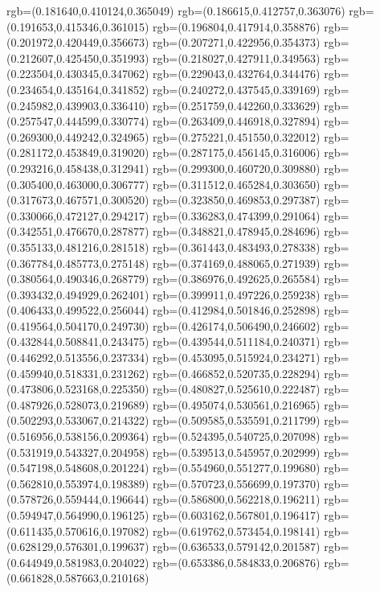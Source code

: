 {{{			rgb=(0.181640,0.410124,0.365049)
			rgb=(0.186615,0.412757,0.363076)
			rgb=(0.191653,0.415346,0.361015)
			rgb=(0.196804,0.417914,0.358876)
			rgb=(0.201972,0.420449,0.356673)
			rgb=(0.207271,0.422956,0.354373)
			rgb=(0.212607,0.425450,0.351993)
			rgb=(0.218027,0.427911,0.349563)
			rgb=(0.223504,0.430345,0.347062)
			rgb=(0.229043,0.432764,0.344476)
			rgb=(0.234654,0.435164,0.341852)
			rgb=(0.240272,0.437545,0.339169)
			rgb=(0.245982,0.439903,0.336410)
			rgb=(0.251759,0.442260,0.333629)
			rgb=(0.257547,0.444599,0.330774)
			rgb=(0.263409,0.446918,0.327894)
			rgb=(0.269300,0.449242,0.324965)
			rgb=(0.275221,0.451550,0.322012)
			rgb=(0.281172,0.453849,0.319020)
			rgb=(0.287175,0.456145,0.316006)
			rgb=(0.293216,0.458438,0.312941)
			rgb=(0.299300,0.460720,0.309880)
			rgb=(0.305400,0.463000,0.306777)
			rgb=(0.311512,0.465284,0.303650)
			rgb=(0.317673,0.467571,0.300520)
			rgb=(0.323850,0.469853,0.297387)
			rgb=(0.330066,0.472127,0.294217)
			rgb=(0.336283,0.474399,0.291064)
			rgb=(0.342551,0.476670,0.287877)
			rgb=(0.348821,0.478945,0.284696)
			rgb=(0.355133,0.481216,0.281518)
			rgb=(0.361443,0.483493,0.278338)
			rgb=(0.367784,0.485773,0.275148)
			rgb=(0.374169,0.488065,0.271939)
			rgb=(0.380564,0.490346,0.268779)
			rgb=(0.386976,0.492625,0.265584)
			rgb=(0.393432,0.494929,0.262401)
			rgb=(0.399911,0.497226,0.259238)
			rgb=(0.406433,0.499522,0.256044)
			rgb=(0.412984,0.501846,0.252898)
			rgb=(0.419564,0.504170,0.249730)
			rgb=(0.426174,0.506490,0.246602)
			rgb=(0.432844,0.508841,0.243475)
			rgb=(0.439544,0.511184,0.240371)
			rgb=(0.446292,0.513556,0.237334)
			rgb=(0.453095,0.515924,0.234271)
			rgb=(0.459940,0.518331,0.231262)
			rgb=(0.466852,0.520735,0.228294)
			rgb=(0.473806,0.523168,0.225350)
			rgb=(0.480827,0.525610,0.222487)
			rgb=(0.487926,0.528073,0.219689)
			rgb=(0.495074,0.530561,0.216965)
			rgb=(0.502293,0.533067,0.214322)
			rgb=(0.509585,0.535591,0.211799)
			rgb=(0.516956,0.538156,0.209364)
			rgb=(0.524395,0.540725,0.207098)
			rgb=(0.531919,0.543327,0.204958)
			rgb=(0.539513,0.545957,0.202999)
			rgb=(0.547198,0.548608,0.201224)
			rgb=(0.554960,0.551277,0.199680)
			rgb=(0.562810,0.553974,0.198389)
			rgb=(0.570723,0.556699,0.197370)
			rgb=(0.578726,0.559444,0.196644)
			rgb=(0.586800,0.562218,0.196211)
			rgb=(0.594947,0.564990,0.196125)
			rgb=(0.603162,0.567801,0.196417)
			rgb=(0.611435,0.570616,0.197082)
			rgb=(0.619762,0.573454,0.198141)
			rgb=(0.628129,0.576301,0.199637)
			rgb=(0.636533,0.579142,0.201587)
			rgb=(0.644949,0.581983,0.204022)
			rgb=(0.653386,0.584833,0.206876)
			rgb=(0.661828,0.587663,0.210168)
}}}
